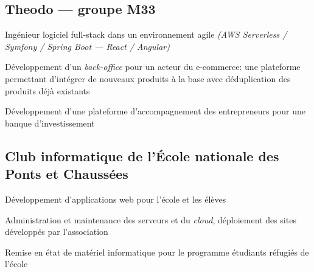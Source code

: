 \subsection{{Theodo --- groupe M33}}
\begin{leftbar}
    \begin{zitemize}
        \item Ingénieur logiciel full-stack dans un environnement agile \textit{(AWS Serverless / Symfony / Spring Boot --- React / Angular)}
        \item Développement d'un \textit{back-office} pour un acteur du e-commerce: une plateforme permettant d'intégrer de nouveaux produits à la base avec déduplication des produits déjà existants
        \item Développement d'une plateforme d'accompagnement des entrepreneurs pour une banque d'investissement
    \end{zitemize}
\end{leftbar}
\subsection{{Club informatique de l’École nationale des Ponts et Chaussées}}
\begin{leftbar}
    \begin{zitemize}
        \item Développement d'applications web pour l'école et les élèves
        \item Administration et maintenance des serveurs et du \textit{cloud}, déploiement des sites développés par l'association
        \item Remise en état de matériel informatique pour le programme étudiants réfugiés de l'école
    \end{zitemize}
\end{leftbar}
